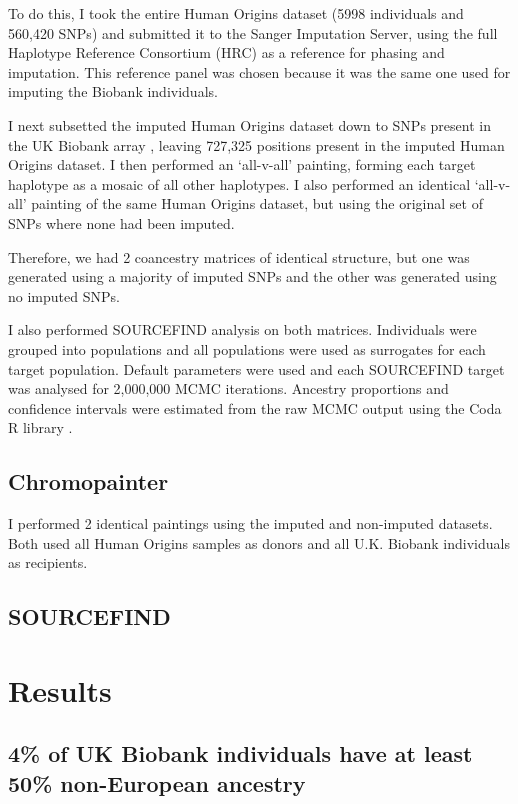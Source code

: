 To do this, I took the entire Human Origins dataset (5998 individuals and 560,420 SNPs) and submitted it to the Sanger Imputation Server, using the full Haplotype Reference Consortium (HRC) as a reference for phasing and imputation. This reference panel was chosen because it was the same one used for imputing the Biobank individuals.

I next subsetted the imputed Human Origins dataset down to SNPs present in the UK Biobank array , leaving 727,325 positions present in the imputed Human Origins dataset. I then performed an `all-v-all' painting, forming each target haplotype as a mosaic of all other haplotypes. I also performed an identical `all-v-all' painting of the same Human Origins dataset, but using the original set of SNPs where none had been imputed. 

Therefore, we had 2 coancestry matrices of identical structure, but one was generated using a majority of imputed SNPs and the other was generated using no imputed SNPs. 

I also performed SOURCEFIND analysis on both matrices. Individuals were grouped into populations and all populations were used as surrogates for each target population. Default parameters were used and each SOURCEFIND target was analysed for 2,000,000 MCMC iterations. Ancestry proportions and confidence intervals were estimated from the raw MCMC output using the Coda R library \cite{oro22547}.

\subsection{Chromopainter}

I performed 2 identical paintings using the imputed and non-imputed datasets. Both used all Human Origins samples as donors and all U.K. Biobank individuals as recipients. 

\subsection{SOURCEFIND}

\section{Results}

\subsection{4\% of UK Biobank individuals have at least 50\% non-European ancestry}

